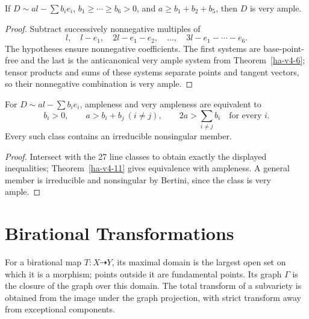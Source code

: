 \begin{lemma}
\label{ha-v4-12}
If \(D\sim al-\sum b_ie_i\), \(b_1\ge\cdots\ge b_6>0\), and
\(a\ge b_1+b_2+b_5\), then \(D\) is very ample.
\end{lemma}
\begin{proof}
Subtract successively nonnegative multiples of
\[
 l,\quad l-e_1,\quad 2l-e_1-e_2,\quad\ldots,\quad3l-e_1-\cdots-e_6.
\]
The hypotheses ensure nonnegative coefficients.  The first systems are
base-point-free and the last is the anticanonical very ample system from
Theorem~\ref{ha-v4-6}; tensor products and sums of these systems separate
points and tangent vectors, so their nonnegative combination is very ample.
\end{proof}

\begin{corollary}
\label{ha-v4-13}
For \(D\sim al-\sum b_ie_i\), ampleness and very ampleness are equivalent to
\[
 b_i>0,\qquad a>b_i+b_j\ (i\ne j),\qquad
 2a>\sum_{i\ne j}b_i\quad\text{for every }i.
\]
Every such class contains an irreducible nonsingular member.
\end{corollary}
\begin{proof}
Intersect with the 27 line classes to obtain exactly the displayed inequalities;
Theorem~\ref{ha-v4-11} gives equivalence with ampleness.  A general member is
irreducible and nonsingular by Bertini, since the class is very ample.
\end{proof}

\section{Birational Transformations}
\label{ha-v5}

\begin{definition}
For a birational map \(T:X\dashrightarrow Y\), its maximal domain is the
largest open set on which it is a morphism; points outside it are fundamental
points.  Its graph $\Gamma$ is the closure of the graph over this domain.  The
total transform of a subvariety is obtained from the image under the graph
projection, with strict transform away from exceptional components.
\end{definition}

